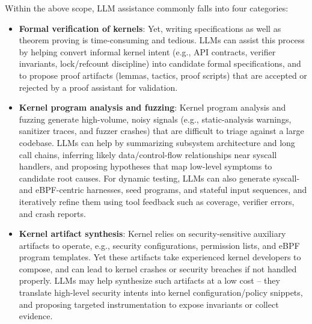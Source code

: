 Within the above scope, LLM assistance commonly falls into four categories:
\begin{itemize}
  \item \textbf{Formal verification of kernels}: 
  Yet, writing specifications as well as theorem proving is time-consuming and tedious.   
  LLMs can assist this process by helping convert informal kernel intent (e.g., API contracts, verifier invariants, lock/refcount discipline) into candidate formal specifications, and to propose proof artifacts (lemmas, tactics, proof scripts) that are accepted or rejected by a proof assistant for validation.
  
  \item \textbf{Kernel program analysis and fuzzing}:
  Kernel program analysis and fuzzing generate high-volume, noisy signals (e.g., static-analysis warnings, sanitizer traces, and fuzzer crashes) that are difficult to triage against a large codebase.
  LLMs can help by summarizing subsystem architecture and long call chains, inferring likely data/control-flow relationships near syscall handlers, and proposing hypotheses that map low-level symptoms to candidate root causes.
  For dynamic testing, LLMs can also generate syscall- and eBPF-centric harnesses, seed programs, and stateful input sequences, and iteratively refine them using tool feedback such as coverage, verifier errors, and crash reports.
  
  \item \textbf{Kernel artifact synthesis}: 
  Kernel relies on security-sensitive auxiliary artifacts to operate, e.g., security configurations, permission lists, and eBPF program templates.
  Yet these artifacts take experienced kernel developers to compose, and can lead to kernel crashes or security breaches if not handled properly.   
  LLMs may help synthesize such artifacts at a low cost -- they translate high-level security intents into kernel configuration/policy snippets, and proposing targeted instrumentation to expose invariants or collect evidence.  
  
  

\end{itemize}
